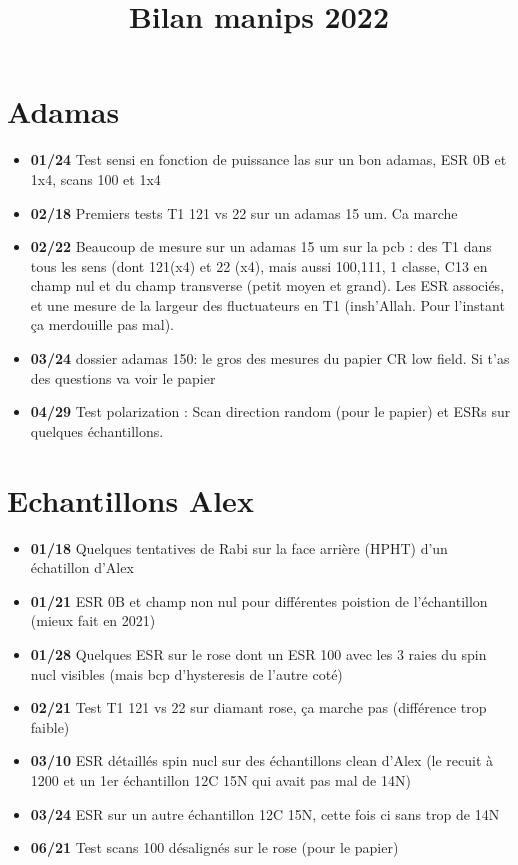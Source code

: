 \documentclass[a4paper]{article}
\title{Bilan manips 2022}
\begin{document}
\maketitle
\section{Adamas}
\begin{itemize}
\item \textbf{01/24} Test sensi en fonction de puissance las sur un bon adamas, ESR 0B et 1x4, scans 100 et 1x4
\item \textbf{02/18} Premiers tests T1 121 vs 22 sur un adamas 15 um. Ca marche
\item \textbf{02/22} Beaucoup de mesure sur un adamas 15 um sur la pcb : des T1 dans tous les sens (dont 121(x4) et 22 (x4), mais aussi 100,111, 1 classe, C13 en champ nul et du champ transverse (petit moyen et grand). Les ESR associés, et une mesure de la largeur des fluctuateurs en T1 (insh'Allah. Pour l'instant ça merdouille pas mal).
\item \textbf{03/24} dossier adamas 150: le gros des mesures du papier CR low field. Si t'as des questions va voir le papier
\item \textbf{04/29} Test polarization : Scan direction random (pour le papier) et ESRs sur quelques échantillons.

\end{itemize}
\section{Echantillons Alex}
\begin{itemize}
\item \textbf{01/18} Quelques tentatives de Rabi sur la face arrière (HPHT) d'un échatillon d'Alex
\item \textbf{01/21} ESR 0B et champ non nul pour différentes poistion de l'échantillon (mieux fait en 2021)
\item \textbf{01/28} Quelques ESR sur le rose dont un ESR 100 avec les 3 raies du spin nucl visibles (mais bcp d'hysteresis de l'autre coté)
\item \textbf{02/21} Test T1 121 vs 22 sur diamant rose, ça marche pas (différence trop faible)
\item \textbf{03/10} ESR détaillés spin nucl sur des échantillons clean d'Alex (le recuit à 1200 et un 1er échantillon 12C 15N qui avait pas mal de 14N)
\item \textbf{03/24} ESR sur un autre échantillon 12C 15N, cette fois ci sans trop de 14N
\item \textbf{06/21} Test scans 100 désalignés sur le rose (pour le papier)
\end{itemize}
\end{document}

